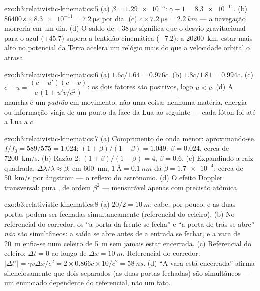 \begin{solution}{exo:b3:relativistic-kinematics:5}
(a) $\beta = \num{1.29e-5}$: $\gamma - 1 = \num{8.3e-11}$. (b)
$86400\,\unit{s} \times \num{8.3e-11} = \qty{7.2}{\micro s}$ por dia.
(c) $c \times \qty{7.2}{\micro s} = \qty{2.2}{km}$ --- a navegação
morreria em um dia. (d) O saldo de $+38\,\unit{\micro s}$ significa que
o desvio gravitacional para o azul ($+45.7$) supera a lentidão
cinemática ($-7.2$): a \qty{20200}{km}, estar mais alto no potencial da
Terra acelera um relógio mais do que a velocidade orbital o atrasa.
\end{solution}

\begin{solution}{exo:b3:relativistic-kinematics:6}
(a) $1.6c/1.64 = 0.976c$. (b) $1.8c/1.81 = 0.994c$. (c) $c - u =
\dfrac{(c - u')(c - v)}{c\,(1 + u'v/c^2)}$: os dois fatores são
positivos, logo $u < c$. (d) A mancha é um \emph{padrão} em movimento,
não uma coisa: nenhuma matéria, energia ou informação viaja de um ponto
da face da Lua ao seguinte --- cada fóton foi até a Lua a $c$.
\end{solution}

\begin{solution}{exo:b3:relativistic-kinematics:7}
(a) Comprimento de onda menor: aproximando-se. $f/f_0 = 589/575 = 1.024$;
$(1+\beta)/(1-\beta) = 1.049$: $\beta = 0.024$, cerca de
\qty{7200}{km/s}. (b) Razão $2$: $(1+\beta)/(1-\beta) = 4$, $\beta =
0.6$. (c) Expandindo a raiz quadrada, $\Delta\lambda/\lambda \approx
\beta$; em \qty{600}{nm}, $\qty{1}{\angstrom} = \qty{0.1}{nm}$ dá
$\beta = \num{1.7e-4}$: cerca de \qty{50}{km/s} por ångström --- o
reflexo do astrônomo. (d) O efeito Doppler transversal: pura , de ordem $\beta^2$ --- mensurável apenas com precisão
atômica.
\end{solution}

\begin{solution}{exo:b3:relativistic-kinematics:8}
(a) $20/2 = \qty{10}{m}$: cabe, por pouco, e as duas portas podem ser
fechadas simultaneamente (referencial do celeiro). (b) No referencial
do corredor, os  ``a porta da frente se fecha'' e ``a porta de
trás se abre'' \emph{não} são simultâneos: a saída se abre antes de a
entrada se fechar, e a vara de \qty{20}{m} enfia-se num celeiro de
\qty{5}{m} sem jamais estar encerrada. (c) Referencial do celeiro:
$\Delta t = 0$ ao longo de $\Delta x =
\qty{10}{m}$. Referencial do corredor: $|\Delta t'| = \gamma v\Delta x/c^2 =
2 \times 0.866c \times 10/c^2 = \qty{58}{ns}$. (d) ``A vara está
encerrada'' afirma silenciosamente que dois  separados (as duas
portas fechadas) são simultâneos --- um enunciado dependente do
referencial, não um fato.
\end{solution}

